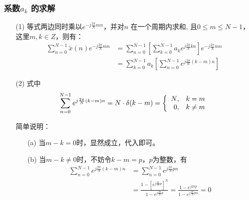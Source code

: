 \documentclass[notheorems,compress,mathserif,table]{beamer}
\begin{document}
\begin{frame}[allowframebreaks]\frametitle{系数$a_{k}$ 的求解}%
\begin{enumerate}
\item [(1)]
等式两边同时乘以$e^{-j\frac{2\pi}{N}mn}$，并对$n$ 在一个周期内求和,
且$0\leqslant m\leqslant N-1$，这里$m,k\in Z$，则有：
\begin{equation*}
\begin{split}
\sum_{n=0}^{N-1}\tilde{x}(n)e^{-j\frac{2\pi}{N}mn}
&= \sum_{n=0}^{N-1}\left[\sum_{k=0}^{N-1}a_{k}e^{j\frac{2\pi}{N}kn}\right]e^{-j\frac{2\pi}{N}mn}\\
&=  \sum_{k=0}^{N-1}a_{k}\left[\sum_{n=0}^{N-1}e^{j\frac{2\pi}{N}(k-m)n}\right]
\end{split}
\end{equation*}
\end{enumerate}
%
%
%
%


\newpage
\begin{enumerate}
\item [(2)] 式中
\begin{equation*}
\sum_{n=0}^{N-1}e^{j\frac{2\pi}{N}(k-m)n} = N\cdot \delta(k-m)
= \left\{\begin{array}
{r@{,\quad}l}
N&\mbox{$k=m$}\\0&\mbox{$k\neq m$}
\end{array} \right.
\end{equation*}

简单说明：
\begin{enumerate}\par
\item  [(a)]当$m-k=0$时，显然成立，代入即可。
\item  [(b)]当$m-k\neq 0$时，不妨令$k-m=p$，$p$为整数，有
\begin{equation*}
\begin{split}
\sum_{n=0}^{N-1}e^{j\frac{2\pi}{N}(k-m)n}
&= \sum_{n=0}^{N-1}e^{j\frac{2\pi}{N}pn} \\
&= \frac{1-\left[e^{j\frac{2\pi}{N}p}\right]^{N}}{1-e^{j\frac{2\pi}{N}p}}
= \frac{1-e^{j2\pi p}}{1-e^{j\frac{2\pi}{N}pn}}  =0
\end{split}
\end{equation*}
\end{enumerate}
\end{enumerate}
%
%
%


\end{frame}
\end{document}
